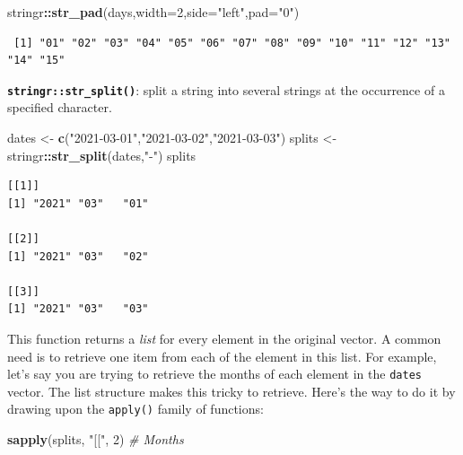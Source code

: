 \documentclass[
]{book}
\newenvironment{Shaded}{\begin{snugshade}}{\end{snugshade}}
\newcommand{\CommentTok}[1]{\textcolor[rgb]{0.56,0.35,0.01}{\textit{#1}}}
\newcommand{\DataTypeTok}[1]{\textcolor[rgb]{0.13,0.29,0.53}{#1}}
\newcommand{\DecValTok}[1]{\textcolor[rgb]{0.00,0.00,0.81}{#1}}
\newcommand{\KeywordTok}[1]{\textcolor[rgb]{0.13,0.29,0.53}{\textbf{#1}}}
\newcommand{\NormalTok}[1]{#1}
\newcommand{\OperatorTok}[1]{\textcolor[rgb]{0.81,0.36,0.00}{\textbf{#1}}}
\newcommand{\StringTok}[1]{\textcolor[rgb]{0.31,0.60,0.02}{#1}}
\begin{document}
\begin{Shaded}
\begin{Highlighting}[]
\NormalTok{stringr}\OperatorTok{::}\KeywordTok{str_pad}\NormalTok{(days,}\DataTypeTok{width=}\DecValTok{2}\NormalTok{,}\DataTypeTok{side=}\StringTok{"left"}\NormalTok{,}\DataTypeTok{pad=}\StringTok{"0"}\NormalTok{)}
\end{Highlighting}
\end{Shaded}

\begin{verbatim}
 [1] "01" "02" "03" "04" "05" "06" "07" "08" "09" "10" "11" "12" "13" "14" "15"
\end{verbatim}

\textbf{\texttt{stringr::str\_split()}}: split a string into several strings at the occurrence of a specified character.

\begin{Shaded}
\begin{Highlighting}[]
\NormalTok{dates <-}\StringTok{ }\KeywordTok{c}\NormalTok{(}\StringTok{"2021-03-01"}\NormalTok{,}\StringTok{"2021-03-02"}\NormalTok{,}\StringTok{"2021-03-03"}\NormalTok{)}
\NormalTok{splits <-}\StringTok{ }\NormalTok{stringr}\OperatorTok{::}\KeywordTok{str_split}\NormalTok{(dates,}\StringTok{"-"}\NormalTok{)}
\NormalTok{splits}
\end{Highlighting}
\end{Shaded}

\begin{verbatim}
[[1]]
[1] "2021" "03"   "01"  

[[2]]
[1] "2021" "03"   "02"  

[[3]]
[1] "2021" "03"   "03"  
\end{verbatim}

This function returns a \emph{list} for every element in the original vector. A common need is to retrieve one item from each of the element in this list. For example, let's say you are trying to retrieve the months of each element in the \texttt{dates} vector. The list structure makes this tricky to retrieve. Here's the way to do it by drawing upon the \texttt{apply()} family of functions:

\begin{Shaded}
\begin{Highlighting}[]
\KeywordTok{sapply}\NormalTok{(splits, }\StringTok{"[["}\NormalTok{, }\DecValTok{2}\NormalTok{) }\CommentTok{# Months}
\end{Highlighting}
\end{Shaded}
\end{document}
